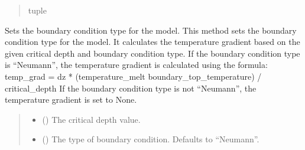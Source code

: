 \documentclass[a4paper,11pt,english,openany]{sphinxmanual}
\begin{document}
\begin{fulllineitems}
\begin{fulllineitems}
\begin{quote}
\begin{description}
\begin{description}
\begin{itemize}
\end{itemize}

\end{description}


\sphinxAtStartPar
tuple

\end{description}\end{quote}

\end{fulllineitems}


\begin{fulllineitems}
\label{\detokenize{api/spyice.models.sea_ice_model:src.spyice.models.sea_ice_model.SeaIceModel.set_boundary_condition_type}}
\pysigstartsignatures
\pysiglinewithargsret
{}
{\sphinxparamcomma {}}
{}
\pysigstopsignatures
\sphinxAtStartPar
Sets the boundary condition type for the model. This method sets the boundary condition type for the model. It calculates the temperature gradient based on the given critical depth and boundary condition type. If the boundary condition type is “Neumann”, the temperature gradient is calculated using the formula:
temp\_grad = dz * (temperature\_melt \sphinxhyphen{} boundary\_top\_temperature) / critical\_depth
If the boundary condition type is not “Neumann”, the temperature gradient is set to None.
\begin{quote}\begin{description}
\begin{itemize}
\item {} 
\sphinxAtStartPar
{} () \textendash{} The critical depth value.

\item {} 
\sphinxAtStartPar
{} (\sphinxstyleliteralemphasis{\sphinxupquote{, }}) \textendash{} The type of boundary condition. Defaults to “Neumann”.


\end{itemize}
\end{description}
\end{quote}
\end{fulllineitems}
\end{fulllineitems}
\end{document}
